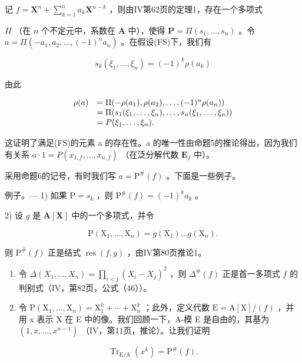 记 \(f = \mathbf{X}^n + \sum_{k=1}^{n} a_k \mathbf{X}^{n-k}\) ，则由IV第62页的定理1，存在一个多项式

\(\Pi\) （在 \(n\) 个不定元中，系数在 \(\mathbf{A}\) 中），使得 \(\mathbf{P} = \Pi(s_1, \ldots, s_n)\) 。令 \(a = \Pi(-a_1, a_2, \ldots, (-1)^n a_n)\) 。在假设(FS)下，我们有

\[
s _ {k} (\xi_ {1}, \dots , \xi_ {n}) = (- 1) ^ {k} \rho (a _ {k})
\]

由此

\[
\begin{array}{r l} \rho (a) & = \Pi (- \rho (a _ {1}), \rho (a _ {2}), \dots , (- 1) ^ {n} \rho (a _ {n})) \\ & = \Pi (s _ {1} (\xi_ {1}, \dots , \xi_ {n}), \dots , s _ {n} (\xi_ {1}, \dots , \xi_ {n})) \\ & = P (\xi_ {1}, \dots , \xi_ {n}). \end{array}
\]

这证明了满足(FS)的元素 a 的存在性。a 的唯一性由命题5的推论得出，因为我们有关系 \(a \cdot 1 = P(x_{1,f}, \ldots, x_{n,f})\) （在泛分解代数 \(\mathbf{E}_f\) 中）。

采用命题6的记号，有时我们写 \(a = \mathrm{P}^{\#}(f)\) 。下面是一些例子。

例子。--- 1) 如果 \(\mathrm{P} = s_k\) ，则 \(\mathrm{P}^{\#}(f) = (-1)^k a_k\) 。

2) 设 \(g\) 是 \(\mathbf{A}[\mathbf{X}]\) 中的一个多项式，并令

\[
\mathrm{P} \left(\mathrm{X} _ {1}, \dots , \mathrm{X} _ {n}\right) = g \left(\mathrm{X} _ {1}\right) \dots g \left(\mathrm{X} _ {n}\right).
\]

则 \(\mathrm{P}^{\#}(f)\) 正是结式 \(\operatorname{res}(f, g)\) ，由IV第80页推论1。

\begin{enumerate}
\def\labelenumi{\arabic{enumi})}
\setcounter{enumi}{2}
\item
  令 \(\Delta(X_1, \ldots, X_n) = \prod_{i < j} (X_i - X_j)^2\) ，则 \(\Delta^{\#}(f)\) 正是首一多项式 \(f\) 的判别式（IV，第82页，公式（46））。
\item
  令 \(\mathrm{P}(\mathrm{X}_{1},\ldots,\mathrm{X}_{n})=\mathrm{X}_{1}^{k}+\cdots+\mathrm{X}_{n}^{k}\) ；此外，定义代数 \(\mathrm{E}=\mathrm{A}[\mathrm{X}]/(f)\) ，并用 x 表示 X 在 E 中的像。我们回顾一下，A-模 E 是自由的，其基为 \((1,x,\ldots,x^{n-1})\) （IV，第11页，推论）。让我们证明
\end{enumerate}

\[
\operatorname{Tr} _ {\mathrm{E/A}} (x ^ {k}) = \mathrm{P} ^ {\#} (f).\tag{25}
\]

